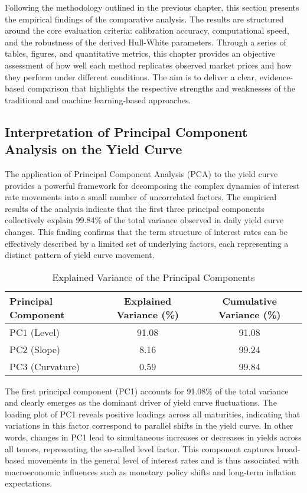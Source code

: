 Following the methodology outlined in the previous chapter, this section presents the empirical findings of the comparative analysis. The results are structured around the core evaluation criteria: calibration accuracy, computational speed, and the robustness of the derived Hull-White parameters. Through a series of tables, figures, and quantitative metrics, this chapter provides an objective assessment of how well each method replicates observed market prices and how they perform under different conditions. The aim is to deliver a clear, evidence-based comparison that highlights the respective strengths and weaknesses of the traditional and machine learning-based approaches.

\subsection{Interpretation of Principal Component Analysis on the Yield Curve}
The application of Principal Component Analysis (PCA) to the yield curve provides a powerful framework for decomposing the complex dynamics of interest rate movements into a small number of uncorrelated factors. The empirical results of the analysis indicate that the first three principal components collectively explain 99.84\% of the total variance observed in daily yield curve changes. This finding confirms that the term structure of interest rates can be effectively described by a limited set of underlying factors, each representing a distinct pattern of yield curve movement.

\begin{table}[H]
	\centering
	\caption{Explained Variance of the Principal Components}
	\label{tab:pca_variance}
	\begin{tabular}{lcc}
		\toprule
		Principal Component & Explained Variance (\%) & Cumulative Variance (\%) \\
		\midrule
		PC1 (Level)         & 91.08                   & 91.08                    \\
		PC2 (Slope)         & 8.16                    & 99.24                    \\
		PC3 (Curvature)     & 0.59                    & 99.84                    \\
		\bottomrule
	\end{tabular}
\end{table}

The first principal component (PC1) accounts for 91.08\% of the total variance and clearly emerges as the dominant driver of yield curve fluctuations. The loading plot of PC1 reveals positive loadings across all maturities, indicating that variations in this factor correspond to parallel shifts in the yield curve. In other words, changes in PC1 lead to simultaneous increases or decreases in yields across all tenors, representing the so-called level factor. This component captures broad-based movements in the general level of interest rates and is thus associated with macroeconomic influences such as monetary policy shifts and long-term inflation expectations.

